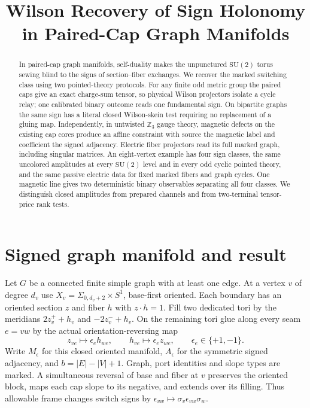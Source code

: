 \documentclass[11pt]{article}
\title{Wilson Recovery of Sign Holonomy in Paired-Cap Graph Manifolds}
\author{}
\date{}
\begin{document}
\maketitle
\begin{abstract}
In paired-cap graph manifolds, self-duality makes the unpunctured \(\mathrm{SU}(2)\) torus sewing blind to the signs of section--fiber exchanges. We recover the marked switching class using two pointed-theory protocols. For any finite odd metric group the paired caps give an exact charge-sum tensor, so physical Wilson projectors isolate a cycle relay; one calibrated binary outcome reads one fundamental sign. On bipartite graphs the same sign has a literal closed Wilson-skein test requiring no replacement of a gluing map. Independently, in untwisted \(\mathbb Z_3\) gauge theory, magnetic defects on the existing cap cores produce an affine constraint with source the magnetic label and coefficient the signed adjacency. Electric fiber projectors read its full marked graph, including singular matrices. An eight-vertex example has four sign classes, the same uncolored amplitudes at every \(\mathrm{SU}(2)\) level and in every odd cyclic pointed theory, and the same passive electric data for fixed marked fibers and graph cycles. One magnetic line gives two deterministic binary observables separating all four classes. We distinguish closed amplitudes from prepared channels and from two-terminal tensor-price rank tests.
\end{abstract}

\section{Signed graph manifold and result}

Let \(G\) be a connected finite simple graph with at least one edge. At a vertex \(v\) of degree \(d_v\) use \(X_v=\Sigma_{0,d_v+2}\times S^1\), base-first oriented. Each boundary has an oriented section \(z\) and fiber \(h\) with \(z\cdot h=1\). Fill two dedicated tori by the meridians \(2z_v^++h_v\) and \(-2z_v^-+h_v\). On the remaining tori glue along every seam \(e=vw\) by the actual orientation-reversing map
\begin{equation}
 z_{ve}\longmapsto\epsilon_e h_{we},\qquad h_{ve}\longmapsto \epsilon_e z_{we},
 \qquad \epsilon_e\in\{+1,-1\}.
 \label{eq:seam}
\end{equation}
Write \(M_\epsilon\) for this closed oriented manifold, \(A_\epsilon\) for the symmetric signed adjacency, and \(b=|E|-|V|+1\). Graph, port identities and slope types are marked. A simultaneous reversal of base and fiber at \(v\) preserves the oriented block, maps each cap slope to its negative, and extends over its filling. Thus allowable frame changes switch signs by \(\epsilon_{vw}\mapsto \sigma_v\epsilon_{vw}\sigma_w\).
\end{document}
